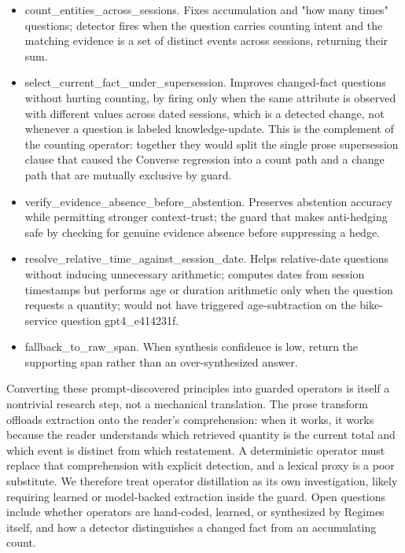 \begin{itemize}
\item count\_entities\_across\_sessions. Fixes accumulation and "how many times" questions; detector fires when the question carries counting intent and the matching evidence is a set of distinct events across sessions, returning their sum.
\item select\_current\_fact\_under\_supersession. Improves changed-fact questions without hurting counting, by firing only when the same attribute is observed with different values across dated sessions, which is a detected change, not whenever a question is labeled knowledge-update. This is the complement of the counting operator: together they would split the single prose supersession clause that caused the Converse regression into a count path and a change path that are mutually exclusive by guard.
\item verify\_evidence\_absence\_before\_abstention. Preserves abstention accuracy while permitting stronger context-trust; the guard that makes anti-hedging safe by checking for genuine evidence absence before suppressing a hedge.
\item resolve\_relative\_time\_against\_session\_date. Helps relative-date questions without inducing unnecessary arithmetic; computes dates from session timestamps but performs age or duration arithmetic only when the question requests a quantity; would not have triggered age-subtraction on the bike-service question gpt4\_e414231f.
\item fallback\_to\_raw\_span. When synthesis confidence is low, return the supporting span rather than an over-synthesized answer.
\end{itemize}

Converting these prompt-discovered principles into guarded operators is itself a nontrivial research step, not a mechanical translation. The prose transform offloads extraction onto the reader's comprehension: when it works, it works because the reader understands which retrieved quantity is the current total and which event is distinct from which restatement. A deterministic operator must replace that comprehension with explicit detection, and a lexical proxy is a poor substitute. We therefore treat operator distillation as its own investigation, likely requiring learned or model-backed extraction inside the guard. Open questions include whether operators are hand-coded, learned, or synthesized by Regimes itself, and how a detector distinguishes a changed fact from an accumulating count.

